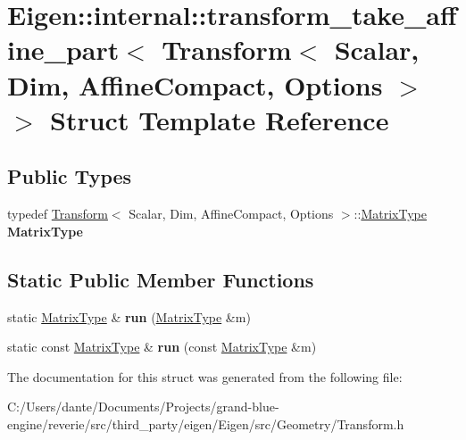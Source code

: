 \hypertarget{struct_eigen_1_1internal_1_1transform__take__affine__part_3_01_transform_3_01_scalar_00_01_dim_08d14c40ff031aad52694585e78471f26}{}\section{Eigen\+::internal\+::transform\+\_\+take\+\_\+affine\+\_\+part$<$ Transform$<$ Scalar, Dim, Affine\+Compact, Options $>$ $>$ Struct Template Reference}
\label{struct_eigen_1_1internal_1_1transform__take__affine__part_3_01_transform_3_01_scalar_00_01_dim_08d14c40ff031aad52694585e78471f26}
\subsection*{Public Types}
\begin{DoxyCompactItemize}
\item 
\mbox{\label{struct_eigen_1_1internal_1_1transform__take__affine__part_3_01_transform_3_01_scalar_00_01_dim_08d14c40ff031aad52694585e78471f26_a632080f63098e5039fd648d427f0e612}} 
typedef \mbox{\hyperlink{class_eigen_1_1_transform}{Transform}}$<$ Scalar, Dim, Affine\+Compact, Options $>$\+::\mbox{\hyperlink{class_eigen_1_1_matrix}{Matrix\+Type}} {\bfseries Matrix\+Type}
\end{DoxyCompactItemize}
\subsection*{Static Public Member Functions}
\begin{DoxyCompactItemize}
\item 
\mbox{\label{struct_eigen_1_1internal_1_1transform__take__affine__part_3_01_transform_3_01_scalar_00_01_dim_08d14c40ff031aad52694585e78471f26_aa2df7b84656bd21548e11e803dd86bdd}} 
static \mbox{\hyperlink{class_eigen_1_1_matrix}{Matrix\+Type}} \& {\bfseries run} (\mbox{\hyperlink{class_eigen_1_1_matrix}{Matrix\+Type}} \&m)
\item 
\mbox{\label{struct_eigen_1_1internal_1_1transform__take__affine__part_3_01_transform_3_01_scalar_00_01_dim_08d14c40ff031aad52694585e78471f26_a41e8ddcf8683644c077f6b90d14ee620}} 
static const \mbox{\hyperlink{class_eigen_1_1_matrix}{Matrix\+Type}} \& {\bfseries run} (const \mbox{\hyperlink{class_eigen_1_1_matrix}{Matrix\+Type}} \&m)
\end{DoxyCompactItemize}


The documentation for this struct was generated from the following file\+:\begin{DoxyCompactItemize}
\item 
C\+:/\+Users/dante/\+Documents/\+Projects/grand-\/blue-\/engine/reverie/src/third\+\_\+party/eigen/\+Eigen/src/\+Geometry/Transform.\+h\end{DoxyCompactItemize}

